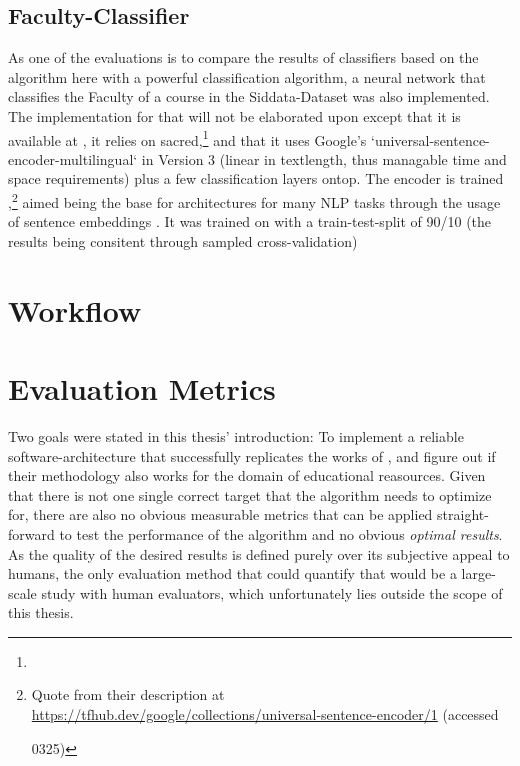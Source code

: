 

\subsection*{Faculty-Classifier}
\label{sec:faculty_classifier}

As one of the evaluations is to compare the results of classifiers based on the algorithm here with a powerful classification algorithm, a neural network that classifies the Faculty of a course in the Siddata-Dataset was also implemented. The implementation for that will not be elaborated upon except that it is available at , it relies on sacred,\footnote{} and that it uses Google's `universal-sentence-encoder-multilingual` in Version 3 (linear in textlength, thus managable time and space requirements) plus a few classification layers ontop. The encoder is trained ,\footnote{Quote from their description at \url{https://tfhub.dev/google/collections/universal-sentence-encoder/1} (accessed \date{2022}{03}{25})} aimed being the base for architectures for many NLP tasks through the usage of sentence embeddings \cite{Cer2018}. It was trained on with a train-test-split of 90/10 (the results being consitent through sampled cross-validation)



\section{Workflow}
\label{sec:workflow}





\section{Evaluation Metrics}
\label{sec:eval_metrics}

Two goals were stated in this thesis' introduction: To implement a reliable software-architecture that successfully replicates the works of \textcite{Derrac2015}, and figure out if their methodology also works for the domain of educational reasources. Given that there is not one single correct target that the algorithm needs to optimize for, there are also no obvious measurable metrics that can be applied straight-forward to test the performance of the algorithm and no obvious \textit{optimal results}. As the quality of the desired results is defined purely over its subjective appeal to humans, the only evaluation method that could quantify that would be a large-scale study with human evaluators, which unfortunately lies outside the scope of this thesis.

